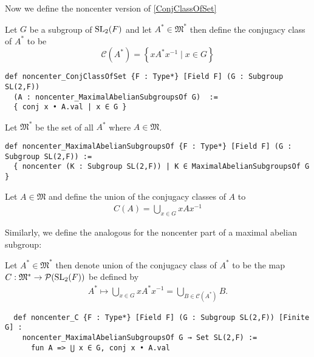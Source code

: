 Now we define the noncenter version of \ref{ConjClassOfSet}

\begin{definition}
  \label{noncenter_ConjClassOfSet}
  \leanok
  Let $G$ be a subgroup of $\operatorname{SL}_2(F)$ and let $A^* \in \mathfrak{M}^*$ then define the conjugacy class of $A^*$ to be
  \[
  \mathcal{C}(A^*) = \left\{x A^* x^{-1} \; | \; x \in G \right\}
   \]
\end{definition}
\begin{footnotesize}
\begin{verbatim}
def noncenter_ConjClassOfSet {F : Type*} [Field F] (G : Subgroup SL(2,F))
  (A : noncenter_MaximalAbelianSubgroupsOf G)  :=
  { conj x • A.val | x ∈ G }
\end{verbatim}
\end{footnotesize}

\begin{definition}
\label{noncenter_MaximalAbelianSubgroupsOf}
\leanok
Let $\mathfrak{M}^*$ be the set of all $A^*$ where $A \in \mathfrak{M}$.
\end{definition}
\begin{footnotesize}
\begin{verbatim}
def noncenter_MaximalAbelianSubgroupsOf {F : Type*} [Field F] (G : Subgroup SL(2,F)) :=
  { noncenter (K : Subgroup SL(2,F)) | K ∈ MaximalAbelianSubgroupsOf G }
\end{verbatim}
\end{footnotesize}

\begin{definition}
\label{C}
\leanok
Let $A \in \mathfrak{M}$ and define the union of the conjugacy classes of $A$ to
\begin{align*} 
  C(A) = \bigcup_{x \in G} x A x^{-1}
\end{align*}
\end{definition}


Similarly, we define the analogous for the noncenter part of a maximal abelian subgroup:

\begin{definition}
  \label{noncenter_C}
  \leanok
  Let $A^* \in \mathfrak{M}^*$ then denote union of the conjugacy class of $A^*$ to be the
  map $C : \mathfrak{M}^* \rightarrow \mathcal{P}(\operatorname{SL}_2(F))$ be defined by
\begin{align*}
  A^* \mapsto \bigcup_{x \in G} x A^* x^{-1} = \bigcup_{B \in \mathcal{C}(A^*)} B.
\end{align*}
\end{definition}
\begin{footnotesize}
  \begin{verbatim}
  def noncenter_C {F : Type*} [Field F] (G : Subgroup SL(2,F)) [Finite G] :
    noncenter_MaximalAbelianSubgroupsOf G → Set SL(2,F) :=
      fun A => ⋃ x ∈ G, conj x • A.val
  \end{verbatim}
\end{footnotesize}

